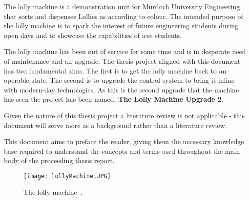 The lolly machine is a demonstration unit for Murdoch University Engineering that sorts and dispenses Lollies as according to colour. The intended purpose of the lolly machine is to spark the interest of future engineering students during open days and to showcase the capabilities of \acrlong{icse} students.

The lolly machine has been out of service for some time and is in desperate need of maintenance and an upgrade. The thesis project aligned with this document has two fundamental aims. The first is to get the lolly machine back to an operable state. The second is to upgrade the control system to bring it inline with modern-day technologies. As this is the second upgrade that the machine has seen the project has been named, \textbf{The Lolly Machine Upgrade 2}.

Given the nature of this thesis project a literature review is not applicable - this document will serve more as a background rather than a literature review.

This document aims to preface the reader, giving them the necessary knowledge base required to understand the concepts and terms used throughout the main body of the proceeding thesis report.

    \begin{figure}[ht]
        \centering
        \texttt{[image: lollyMachine.JPG]}
        \caption{The lolly machine~\cite{thesisJodie}.}
        \label{fig:lollyMachine}
    \end{figure}
